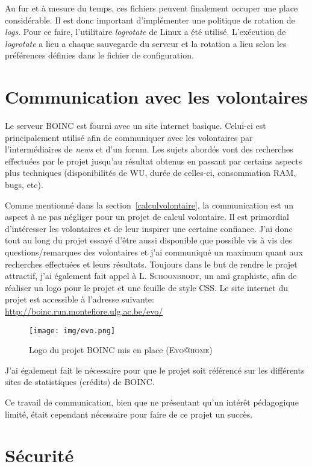 \documentclass[a4paper, 11pt]{report}
\begin{document}
Au fur et à mesure du temps, ces fichiers peuvent finalement occuper une place considérable. Il est donc important d'implémenter une politique de rotation de \textit{logs}. Pour ce faire, l'utilitaire \textit{logrotate} de Linux a été utilisé. L'exécution de \textit{logrotate} a lieu a chaque sauvegarde du serveur et la rotation a lieu selon les préférences définies dans le fichier de configuration. %

\section{Communication avec les volontaires}
Le serveur \textsc{BOINC} est fourni avec un site internet basique. Celui-ci est principalement utilisé afin de communiquer avec les volontaires par l'intermédiaires de \textit{news} et d'un forum. Les sujets abordés vont des recherches effectuées par le projet jusqu'au résultat obtenus en passant par certains aspects plus techniques (disponibilités de WU, durée de celles-ci, consommation RAM, bugs, etc).

Comme mentionné dans la section~\ref{calculvolontaire}, la communication est un aspect à ne pas négliger pour un projet de calcul volontaire. Il est primordial d'intéresser les volontaires et de leur inspirer une certaine confiance. J'ai donc tout au long du projet essayé d'être aussi disponible que possible vis à vis des questions/remarques des volontaires et j'ai communiqué un maximum quant aux recherches effectuées et leurs résultats.
Toujours dans le but de rendre le projet attractif, j'ai également fait appel à L. \textsc{Schoonbrodt}, un ami graphiste, afin de réaliser un logo pour le projet et une feuille de style CSS. Le site internet du projet est accessible à l'adresse suivante: \url{http://boinc.run.montefiore.ulg.ac.be/evo/}

\begin{figure}[!h]
\centering
\texttt{[image: img/evo.png]}
\caption{Logo du projet \textsc{BOINC} mis en place (\textsc{Evo@home})}
\label{evologo}
\end{figure}

J'ai également fait le nécessaire pour que le projet soit référencé sur les différents sites de statistiques (crédits) de \textsc{BOINC}.

Ce travail de communication, bien que ne présentant qu'un intérêt pédagogique limité, était cependant nécessaire pour faire de ce projet un succès.
\section{Sécurité}
\end{document}
